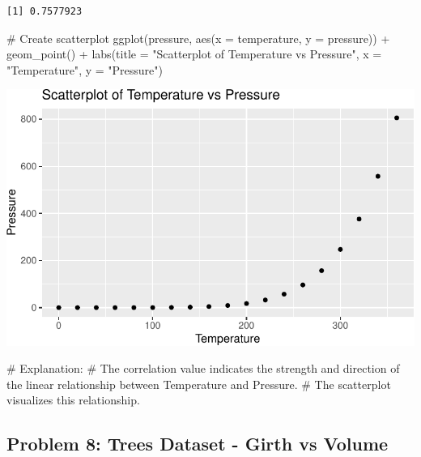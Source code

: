 \documentclass[
  letterpaper,
  DIV=11,
  numbers=noendperiod]{scrreprt}
\newenvironment{Shaded}{\begin{snugshade}}{\end{snugshade}}
\newcommand{\AttributeTok}[1]{\textcolor[rgb]{0.40,0.45,0.13}{#1}}
\newcommand{\CommentTok}[1]{\textcolor[rgb]{0.37,0.37,0.37}{#1}}
\newcommand{\FunctionTok}[1]{\textcolor[rgb]{0.28,0.35,0.67}{#1}}
\newcommand{\NormalTok}[1]{\textcolor[rgb]{0.00,0.23,0.31}{#1}}
\newcommand{\SpecialCharTok}[1]{\textcolor[rgb]{0.37,0.37,0.37}{#1}}
\newcommand{\StringTok}[1]{\textcolor[rgb]{0.13,0.47,0.30}{#1}}
\begin{document}
\begin{verbatim}
[1] 0.7577923
\end{verbatim}

\begin{Shaded}
\begin{Highlighting}[]
\CommentTok{\# Create scatterplot}
\FunctionTok{ggplot}\NormalTok{(pressure, }\FunctionTok{aes}\NormalTok{(}\AttributeTok{x =}\NormalTok{ temperature, }\AttributeTok{y =}\NormalTok{ pressure)) }\SpecialCharTok{+}
  \FunctionTok{geom\_point}\NormalTok{() }\SpecialCharTok{+}
  \FunctionTok{labs}\NormalTok{(}\AttributeTok{title =} \StringTok{"Scatterplot of Temperature vs Pressure"}\NormalTok{, }\AttributeTok{x =} \StringTok{"Temperature"}\NormalTok{, }\AttributeTok{y =} \StringTok{"Pressure"}\NormalTok{)}
\end{Highlighting}
\end{Shaded}

\includegraphics{Scatterplots_and_Correlation_files/figure-pdf/unnamed-chunk-12-1.pdf}

\begin{Shaded}
\begin{Highlighting}[]
\CommentTok{\# Explanation:}
\CommentTok{\# The correlation value indicates the strength and direction of the linear relationship between Temperature and Pressure.}
\CommentTok{\# The scatterplot visualizes this relationship.}
\end{Highlighting}
\end{Shaded}

\subsection*{Problem 8: Trees Dataset - Girth vs
Volume}\label{problem-8-trees-dataset---girth-vs-volume}
\end{document}

